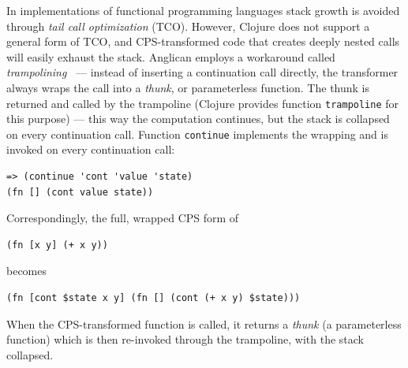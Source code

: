 \documentclass[sigconf]{acmart}
\begin{document}
\iftoggle{full}{
Continuations are functions that are called in tail positions
with the computed value and state as their arguments --- in CPS
there is always a function call in every tail position and never
a value. Continuations are passed to CPS transformers, and when
transformers are called recursively, the continuations are
generated on the fly.

There are two critical issues related to generation of
continuations:
\begin{itemize}
    \item unbounded \textit{stack growth} in recursive code;
    \item code size \textit{explosion} when a non-atomic
        continuation is symbolically substituted in multiple
        locations.
\end{itemize}

\paragraph{Managing stack size}
}{%
Continuations may lead to unbounded stack growth in
recursive code.
}%
In implementations of functional programming languages stack
growth is avoided through \textit{tail call optimization} (TCO).
However, Clojure does not support a general form of TCO, and
CPS-transformed code that creates deeply nested calls will
easily exhaust the stack. Anglican employs a workaround called
\textit{trampolining}~\cite{B95} --- instead of inserting a
continuation call directly, the transformer always wraps the
call into a \textit{thunk}, or parameterless function. The thunk
is returned and called by the trampoline (Clojure provides
function \texttt{trampoline} for this purpose) --- this way the
computation continues, but the stack is collapsed on every
continuation call. Function \texttt{continue} implements the
wrapping and is invoked on every continuation call:
\begin{lstlisting}[style=default]
=> (continue 'cont 'value 'state)
(fn [] (cont value state))
\end{lstlisting}
Correspondingly, the full, wrapped CPS form of
\begin{lstlisting}[style=default]
(fn [x y] (+ x y))
\end{lstlisting}
becomes
\begin{lstlisting}[style=default]
(fn [cont $state x y] (fn [] (cont (+ x y) $state)))
\end{lstlisting}
When the CPS-transformed function is called, it returns a
\textit{thunk} (a parameterless function) which is then
re-invoked through the trampoline, with the stack collapsed.
\end{document}
